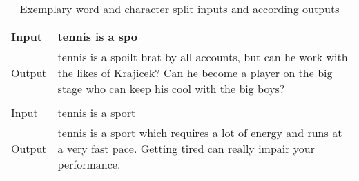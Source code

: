 \begin{table}
		\begin{tabular}{ l | p{14cm} }
		Input & tennis is a spo \\ \hline
  		Output & tennis is a spoilt brat by all accounts, but can he work with the likes of Krajicek? Can he become a player on the big stage who can keep his cool with the big boys? \\
  		\multicolumn{2}{c}{} \\
  		Input & tennis is a sport \\ \hline
  		Output & tennis is a sport which requires a lot of energy and runs at a very fast pace. Getting tired can really impair your performance. \\
	\end{tabular}
	\caption{Exemplary word and character split inputs and according outputs} \label{tab:word_vs_char_split}
\end{table}

